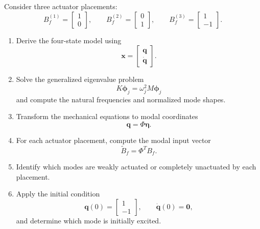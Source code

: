 Consider three actuator placements:
\begin{equation}
B_f^{(1)}
=
\begin{bmatrix}
1\\
0
\end{bmatrix},
\qquad
B_f^{(2)}
=
\begin{bmatrix}
0\\
1
\end{bmatrix},
\qquad
B_f^{(3)}
=
\begin{bmatrix}
1\\
-1
\end{bmatrix}.
\end{equation}

\begin{enumerate}
    \item Derive the four-state model using
    \begin{equation}
    \mathbf{x}
    =
    \begin{bmatrix}
    \mathbf{q}\\
    \dot{\mathbf{q}}
    \end{bmatrix}.
    \end{equation}

    \item Solve the generalized eigenvalue problem
    \begin{equation}
    K\boldsymbol{\phi}_j
    =
    \omega_j^2
    M\boldsymbol{\phi}_j
    \end{equation}
    and compute the natural frequencies and normalized mode shapes.

    \item Transform the mechanical equations to modal coordinates
    \begin{equation}
    \mathbf{q}
    =
    \Phi\boldsymbol{\eta}.
    \end{equation}

    \item For each actuator placement, compute the modal input vector
    \begin{equation}
    \widetilde{B}_f
    =
    \Phi^TB_f.
    \end{equation}

    \item Identify which modes are weakly actuated or completely unactuated
    by each placement.

    \item Apply the initial condition
    \begin{equation}
    \mathbf{q}(0)
    =
    \begin{bmatrix}
    1\\
    -1
    \end{bmatrix},
    \qquad
    \dot{\mathbf{q}}(0)=\mathbf{0},
    \end{equation}
    and determine which mode is initially excited.


\end{enumerate}
